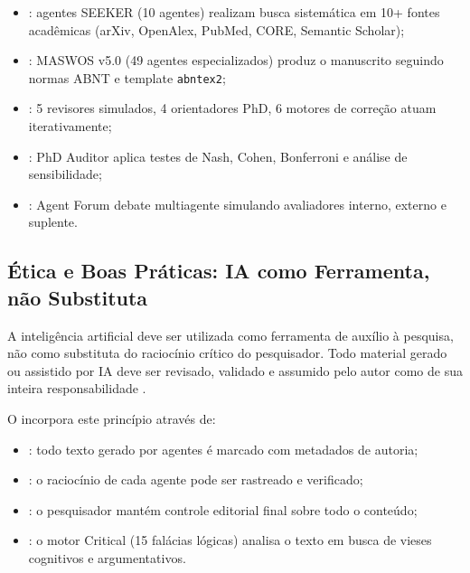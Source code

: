 \begin{itemize}
\item {}: agentes SEEKER (10 agentes) realizam
      busca sistemática em 10+ fontes acadêmicas (arXiv, OpenAlex, PubMed, CORE,
      Semantic Scholar);
\item {}: MASWOS v5.0 (49 agentes especializados)
      produz o manuscrito seguindo normas ABNT e template \texttt{abntex2};
\item {}: 5 revisores simulados, 4 orientadores PhD,
      6 motores de correção atuam iterativamente;
\item {}: PhD Auditor aplica testes de Nash,
      Cohen, Bonferroni e análise de sensibilidade;
\item {}: Agent Forum debate multiagente simulando
      avaliadores interno, externo e suplente.
\end{itemize}

\subsection{Ética e Boas Práticas: IA como Ferramenta, não Substituta}

\begin{definicao}
A inteligência artificial deve ser utilizada como ferramenta de auxílio à
pesquisa, não como substituta do raciocínio crítico do pesquisador. Todo material
gerado ou assistido por IA deve ser revisado, validado e assumido pelo autor como
de sua inteira responsabilidade \cite{bender2021dangers, gebru2021datasheets}.
\end{definicao}

O \opencodeeco{} incorpora este princípio através de:
\begin{itemize}
\item {}: todo texto gerado por agentes é marcado com
      metadados de autoria;
\item {}: o raciocínio de cada agente pode ser rastreado
      e verificado;
\item {}: o pesquisador mantém controle editorial final
      sobre todo o conteúdo;
\item {}: o motor Critical (15 falácias lógicas)
      analisa o texto em busca de vieses cognitivos e argumentativos.
\end{itemize}

